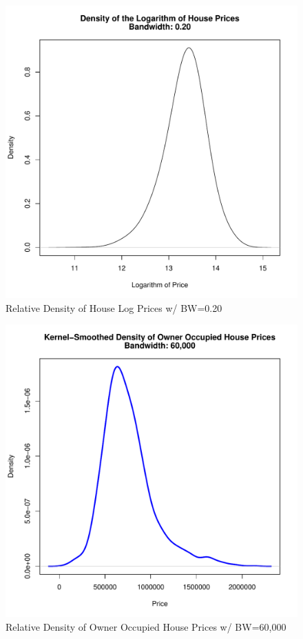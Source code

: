 %
%
\begin{figure}[h!]
  \centering
  \includegraphics[scale = 0.5, keepaspectratio=true]{../Figures/density_log_saleprice_bw020}
  \caption{Relative Density of House Log Prices w/ BW=0.20} \label{fig:density_log_saleprice_bw020}
\end{figure}
%
%
\begin{figure}[h!]
  \centering
  \includegraphics[scale = 0.5, keepaspectratio=true]{../Figures/density_Price_OO}
  \caption{Relative Density of Owner Occupied House Prices w/ BW=60,000} \label{fig:density_Price_OO}
\end{figure}
